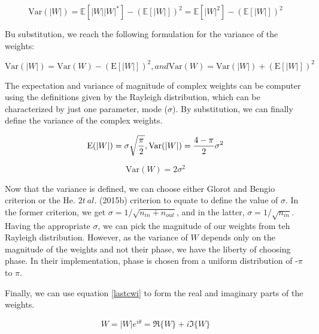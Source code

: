  \begin{equation}\label{varmagrayleighdef}
 \mathrm{Var}(|W|) = \mathbb{E}[|W||W|^{*}]-(\mathbb{E}[|W|])^2 = \mathbb{E}[|W|^{2}]-(\mathbb{E}[|W|])^2
 \end{equation}
 
 Bu substitution, we reach the following formulation for the variance of the weights:
 
 \begin{equation}\label{varw2}
 \mathrm{Var}(|W|) = \mathrm{Var}(W)-(\mathrm{E}[|W|])^2 , and  
 \mathrm{Var}(W) = \mathrm{Var}(|W|) + (\mathrm{E}[|W|])^2
 \end{equation}
  
 The expectation and variance of magnitude of complex weights can be computer using the definitions given by the Rayleigh distribution, which can be characterized by just one parameter, mode ($\sigma$). By substitution, we can finally define the variance of the complex weights.
 
 \begin{equation}\label{ray1}
 \mathrm{E}(|W|) = \sigma\sqrt{\frac{\pi}{2}},\\  
 \mathrm{Var}(|W|) = \frac{4-\pi}{2}\sigma^{2}
 \end{equation}
 
 
 \begin{equation}\label{ray2}
 \mathrm{Var}(W) = 2\sigma^2
 \end{equation}
 
 Now that the variance is defined,  we can choose either Glorot and Bengio criterion or the He. $2t \ al.$ (2015b) criterion to equate to define the value of $\sigma$. In the former criterion, we get $\sigma = 1/\sqrt{n_{in}+n_{out}}$, and in the latter, $\sigma = 1/\sqrt{n_{in}}$. Having the appropriate $\sigma$, we can pick the magnitude of our weights from teh Rayleigh distribution. However, as the variance of $W$ depends only on the magnitude of the weights and not their phase,  we have the liberty of choosing phase. In their implementation, phase is chosen from a uniform distribution of -$\pi$ to $\pi$.
 
 Finally, we can use equation \ref{lastcwi} to form the real and imaginary parts of the weights.
 
 \begin{equation}\label{lastcwi}
 W = |W|e^{i\theta} = \Re\{W\}+i\Im\{W\}
 \end{equation}
 
 
 
